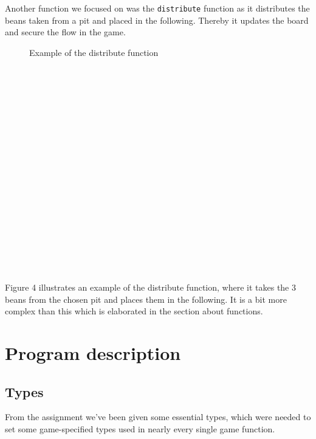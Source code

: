 \documentclass[a4paper]{report}
\begin{document}
Another function we focused on was the \texttt{distribute} 
function as it distributes the beans taken from a pit and placed in the following. Thereby it updates the board and secure the flow in the game.
\begin{figure}
\centering
{}
\caption{Example of the distribute function}
\end{figure}
\\\\
\\\\
\\\\
\\\\
\\\\
\\\\
\\\\
\\\\
\\\\
Figure 4 illustrates an example of the distribute function, where it takes the 3 beans from the chosen pit and places them in the following. It is a bit more complex than this which is elaborated in the section about functions. 

\section*{Program description}
\subsection*{Types}
From the assignment we've been given some essential types, which were needed to set some game-specified types used in nearly every single game function.
\end{document}

